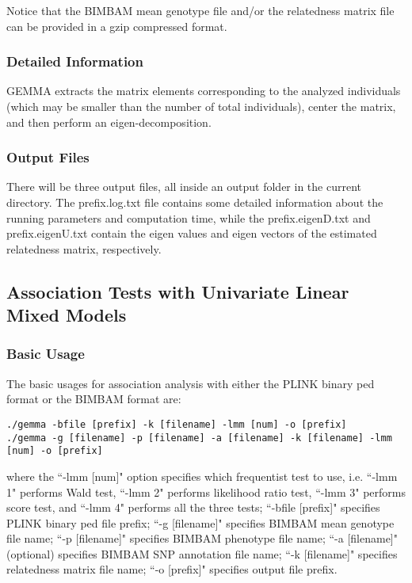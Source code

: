 \documentclass[11pt]{article}
\begin{document}
Notice that the BIMBAM mean genotype file and/or the relatedness matrix file can be provided in a gzip compressed format.

\subsubsection{Detailed Information}
GEMMA extracts the matrix elements corresponding to the analyzed individuals (which may be smaller than the number of total individuals), center the matrix, and then perform an eigen-decomposition. 



\subsubsection{Output Files}
There will be three output files, all inside an output folder in the current directory. The prefix.log.txt file contains some detailed information about the running parameters and computation time, while the prefix.eigenD.txt and prefix.eigenU.txt contain the eigen values and eigen vectors of the estimated relatedness matrix, respectively.



\subsection{Association Tests with Univariate Linear Mixed Models}
\subsubsection{Basic Usage}
The basic usages for association analysis with either the PLINK binary ped format or the BIMBAM format are:
\begin{verbatim}
./gemma -bfile [prefix] -k [filename] -lmm [num] -o [prefix]
./gemma -g [filename] -p [filename] -a [filename] -k [filename] -lmm [num] -o [prefix]
\end{verbatim}
where the ``-lmm [num]" option specifies which frequentist test to use, i.e. ``-lmm 1" performs Wald test, ``-lmm 2" performs likelihood ratio test, ``-lmm 3" performs score test, and ``-lmm 4" performs all the three tests; ``-bfile [prefix]" specifies PLINK binary ped file prefix; ``-g [filename]" specifies BIMBAM mean genotype file name; ``-p [filename]" specifies BIMBAM phenotype file name; ``-a [filename]" (optional) specifies BIMBAM SNP annotation file name; ``-k [filename]" specifies relatedness matrix file name; ``-o [prefix]" specifies output file prefix. 
\end{document}
